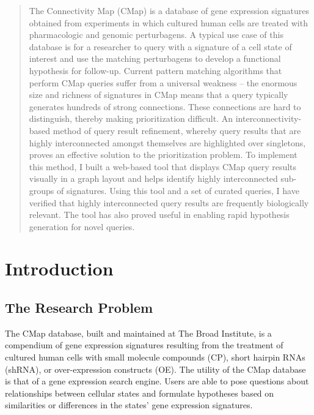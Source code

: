 \documentclass[12pt]{article}
\begin{document}

\begin{abstract}
The Connectivity Map (CMap) is a database of gene expression signatures obtained from experiments in which cultured human cells are treated with pharmacologic and genomic perturbagens. A typical use case of this database is for a researcher to query with a signature of a cell state of interest and use the matching perturbagens to develop a functional hypothesis for follow-up. Current pattern matching algorithms that perform CMap queries suffer from a universal weakness -- the enormous size and richness of signatures in CMap means that a query typically generates hundreds of strong connections. These connections are hard to distinguish, thereby making prioritization difficult. An interconnectivity-based method of query result refinement, whereby query results that are highly interconnected amongst themselves are highlighted over singletons, proves an effective solution to the prioritization problem. To implement this method, I built a web-based tool that displays CMap query results visually in a graph layout and helps identify highly interconnected sub-groups of signatures. Using this tool and a set of curated queries, I have verified that highly interconnected query results are frequently biologically relevant. The tool has also proved useful in enabling rapid hypothesis generation for novel queries.


\end{abstract}

\tableofcontents


\listoffigures

\doublespacing

\section{Introduction}

\subsection{The Research Problem}

The CMap database, built and maintained at The Broad Institute, is a compendium of gene expression signatures resulting from the treatment of cultured human cells with small molecule compounds (CP), short hairpin RNAs (shRNA), or over-expression constructs (OE). The utility of the CMap database is that of a gene expression search engine. Users are able to pose questions about relationships between cellular states and formulate hypotheses based on similarities or differences in the states' gene expression signatures.
\end{document}
